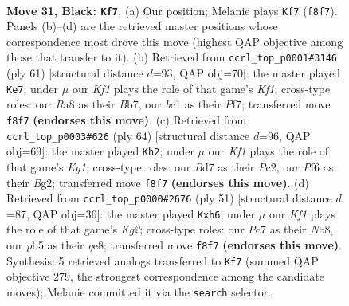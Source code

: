\documentclass[11pt]{article}
\begin{document}
\clearpage

\begin{figure}[p]\centering
\begin{subfigure}{0.46\textwidth}\centering
\resizebox{\linewidth}{!}{%
\newchessgame
\chessboard[
  setfen={r1r2k1Q/pppb4/2n2p2/qP6/3Pp3/6P1/8/RNB2RK1 b - - 3 31},
  showmover=false,
  pgfstyle=straightmove, color=movearrow, markmove={f8-f7}
]}
\caption{}
\end{subfigure}\hfill
\begin{subfigure}{0.46\textwidth}\centering
\resizebox{\linewidth}{!}{%
\newchessgame
\chessboard[
  setfen={2r2k1Q/1b3pp1/1p6/3prq2/p2R4/P1P4R/2P4P/1KN5 b - - 1 31},
  showmover=false,
  pgfstyle=straightmove, color=movearrow, markmove={f8-e7}
]}
\caption{}
\end{subfigure}
\\[4pt]
\begin{subfigure}{0.46\textwidth}\centering
\resizebox{\linewidth}{!}{%
\newchessgame
\chessboard[
  setfen={3r2k1/1p6/6p1/p1Q1p2n/P2N4/1P1Pqr1P/2P3B1/1R3RK1 w - - 1 33},
  showmover=false,
  pgfstyle=straightmove, color=movearrow, markmove={g1-h2}
]}
\caption{}
\end{subfigure}\hfill
\begin{subfigure}{0.46\textwidth}\centering
\resizebox{\linewidth}{!}{%
\newchessgame
\chessboard[
  setfen={rn2Q3/p3p1k1/1p1p3B/4r2p/4q2P/2P5/PP2p1P1/R3R1K1 b - - 1 26},
  showmover=false,
  pgfstyle=straightmove, color=movearrow, markmove={g7-h6}
]}
\caption{}
\end{subfigure}
\caption{\textbf{Move 31, Black: \texttt{Kf7}.} (a) Our position; Melanie plays \texttt{Kf7} (\texttt{f8f7}). Panels (b)--(d) are the retrieved master positions whose correspondence most drove this move (highest QAP objective among those that transfer to it). (b) Retrieved from \texttt{ccrl\_top\_p0001\#3146} (ply 61) [structural distance $d$=93, QAP obj=70]: the master played \texttt{Ke7}; under $\mu$ our \emph{Kf1} plays the role of that game's \emph{Kf1}; cross-type roles: our \emph{R}a8 as their \emph{B}b7, our \emph{b}c1 as their \emph{P}f7; transferred move \texttt{f8f7} \textbf{(endorses this move)}. (c) Retrieved from \texttt{ccrl\_top\_p0003\#626} (ply 64) [structural distance $d$=96, QAP obj=69]: the master played \texttt{Kh2}; under $\mu$ our \emph{Kf1} plays the role of that game's \emph{Kg1}; cross-type roles: our \emph{B}d7 as their \emph{P}c2, our \emph{P}f6 as their \emph{B}g2; transferred move \texttt{f8f7} \textbf{(endorses this move)}. (d) Retrieved from \texttt{ccrl\_top\_p0000\#2676} (ply 51) [structural distance $d$=87, QAP obj=36]: the master played \texttt{Kxh6}; under $\mu$ our \emph{Kf1} plays the role of that game's \emph{Kg2}; cross-type roles: our \emph{P}c7 as their \emph{N}b8, our \emph{p}b5 as their \emph{q}e8; transferred move \texttt{f8f7} \textbf{(endorses this move)}. Synthesis: 5 retrieved analogs transferred to \texttt{Kf7} (summed QAP objective 279, the strongest correspondence among the candidate moves); Melanie committed it via the \texttt{search} selector.}
\label{fig:thought-m61}
\end{figure}
\end{document}

